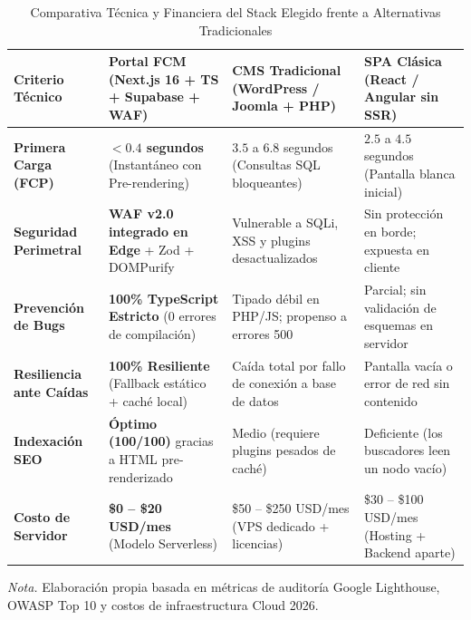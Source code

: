 \documentclass[12pt,a4paper,oneside]{report}
\begin{document}
\begin{table}[htbp]
\centering
\caption{Comparativa Técnica y Financiera del Stack Elegido frente a Alternativas Tradicionales}
\label{tab:comparativa-stack}
\footnotesize
\renewcommand{\arraystretch}{1.4}
\begin{tabularx}{\textwidth}{>{\bfseries\color{unmsmNavy}}L{3.1cm} Y Y Y}
\toprule
\textbf{Criterio Técnico} & \textbf{Portal FCM (Next.js 16 + TS + Supabase + WAF)} & \textbf{CMS Tradicional (WordPress / Joomla + PHP)} & \textbf{SPA Clásica (React / Angular sin SSR)} \\
\midrule
Primera Carga (FCP) & \textbf{$< 0.4$ segundos} (Instantáneo con Pre-rendering) & $3.5$ a $6.8$ segundos (Consultas SQL bloqueantes) & $2.5$ a $4.5$ segundos (Pantalla blanca inicial) \\
Seguridad Perimetral & \textbf{WAF v2.0 integrado en Edge} + Zod + DOMPurify & Vulnerable a SQLi, XSS y plugins desactualizados & Sin protección en borde; expuesta en cliente \\
Prevención de Bugs & \textbf{100\% TypeScript Estricto} (0 errores de compilación) & Tipado débil en PHP/JS; propenso a errores 500 & Parcial; sin validación de esquemas en servidor \\
Resiliencia ante Caídas & \textbf{100\% Resiliente} (Fallback estático + caché local) & Caída total por fallo de conexión a base de datos & Pantalla vacía o error de red sin contenido \\
Indexación SEO & \textbf{Óptimo (100/100)} gracias a HTML pre-renderizado & Medio (requiere plugins pesados de caché) & Deficiente (los buscadores leen un nodo vacío) \\
Costo de Servidor & \textbf{\$0 -- \$20 USD/mes} (Modelo Serverless) & \$50 -- \$250 USD/mes (VPS dedicado + licencias) & \$30 -- \$100 USD/mes (Hosting + Backend aparte) \\
\bottomrule
\end{tabularx}
\vspace{3pt}
\begin{flushleft}
\footnotesize\textit{Nota.} Elaboración propia basada en métricas de auditoría Google Lighthouse, OWASP Top 10 y costos de infraestructura Cloud 2026.
\end{flushleft}
\end{table}

\end{document}
